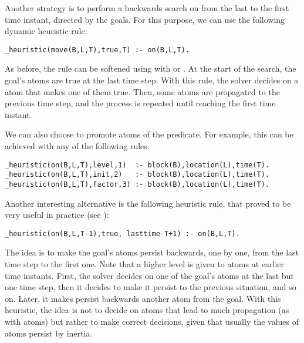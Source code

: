 \begin{example}
Another strategy is to perform a backwards search on  from the last to the
first time instant, directed by the goals. 
For this purpose, we can use the following dynamic heuristic rule: 
\begin{lstlisting}[basicstyle=\small\ttfamily,numbers=none]
_heuristic(move(B,L,T),true,T) :- on(B,L,T).
\end{lstlisting}
As before, the rule can be softened using  with  or .
At the start of the search, the goal's  atoms are true at the last time step.
With this rule, the solver decides on a  atom that makes one of them true.
Then, some  atoms are propagated to the previous time step,
and the process is repeated until reaching the first time instant.

We can also choose to promote atoms of the  predicate.  
For example, this can be achieved with any of the  following rules.
\begin{lstlisting}[basicstyle=\small\ttfamily,numbers=none]
_heuristic(on(B,L,T),level,1)  :- block(B),location(L),time(T).
_heuristic(on(B,L,T),init,2)   :- block(B),location(L),time(T).
_heuristic(on(B,L,T),factor,3) :- block(B),location(L),time(T).
\end{lstlisting}

Another interesting alternative is the following heuristic rule,  
that proved to be very useful in practice (see \cite{gekaotroscwa13a}):
\begin{lstlisting}[basicstyle=\small\ttfamily,numbers=none]
_heuristic(on(B,L,T-1),true, lasttime-T+1) :- on(B,L,T).
\end{lstlisting}
The idea is to make the goal's  atoms persist backwards, 
one by one, from the last time step to the first one.
Note that a higher level is given to atoms at earlier time instants.
First, the solver decides on one of the goal's  atoms at the last but one time step,
then it decides to make it persist to the previous situation, and so on.
Later, it makes persist backwards another  atom from the goal.
With this heuristic,
the idea is not to decide on atoms that lead to much propagation (as with  atoms)
but rather to make correct decisions, 
given that usually the values of  atoms persist by inertia.
\end{example}


